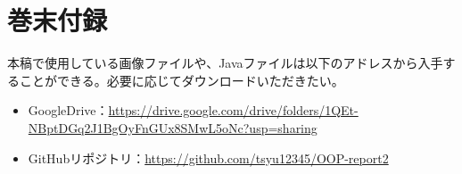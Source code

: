 \documentclass[dvipdfmx]{jsarticle}
\begin{document}
\section{巻末付録}
本稿で使用している画像ファイルや、Javaファイルは以下のアドレスから入手することができる。必要に応じてダウンロードいただきたい。
\begin{itemize}
  \item GoogleDrive：\url{https://drive.google.com/drive/folders/1QEt-NBptDGq2J1BgOyFnGUx8SMwL5oNc?usp=sharing}
  \item GitHubリポジトリ：\url{https://github.com/tsyu12345/OOP-report2}
\end{itemize}
\end{document}
